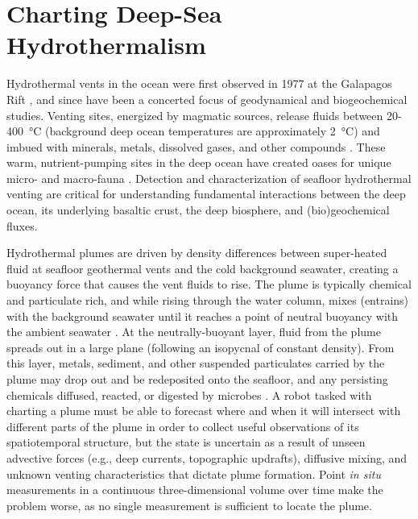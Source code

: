 \section{Charting Deep-Sea Hydrothermalism}
\label{sec:charting-plumes}
Hydrothermal vents in the ocean were first observed in 1977 at the Galapagos Rift \autocite{corliss1979submarine}, and since have been a concerted focus of geodynamical and biogeochemical studies. Venting sites, energized by magmatic sources, release fluids between 20-\SI{400}{\celsius} (background deep ocean temperatures are approximately \SI{2}{\celsius}) and imbued with minerals, metals, dissolved gases, and other compounds \autocite{jannasch1985geomicrobiology, martin2008hydrothermal}. These warm, nutrient-pumping sites in the deep ocean have created oases for unique micro- and macro-fauna \autocite{corliss1979submarine}. Detection and characterization of seafloor hydrothermal venting are critical for understanding fundamental interactions between the deep ocean, its underlying basaltic crust, the deep biosphere, and (bio)geochemical fluxes.

Hydrothermal plumes are driven by density differences between super-heated fluid at seafloor geothermal vents and the cold background seawater, creating a buoyancy force that causes the vent fluids to rise. The plume is typically chemical and particulate rich, and while rising through the water column, mixes (entrains) with the background seawater until it reaches a point of neutral buoyancy with the ambient seawater \autocite{speer1989model,jakuba2007stochastic,morton1956turbulent,lavelle2013turbulent}. At the neutrally-buoyant layer, fluid from the plume spreads out in a large plane (following an isopycnal of constant density). From this layer, metals, sediment, and other suspended particulates carried by the plume may drop out and be redeposited onto the seafloor, and any persisting chemicals diffused, reacted, or digested by microbes \autocite{scholz2019shelf,dick2013microbiology}. A robot tasked with charting a plume must be able to forecast where and when it will intersect with different parts of the plume in order to collect useful observations of its spatiotemporal structure, but the state is uncertain as a result of unseen advective forces (e.g., deep currents, topographic updrafts), diffusive mixing, and unknown venting characteristics that dictate plume formation. Point \emph{in situ} measurements in a continuous three-dimensional volume over time make the problem worse, as no single measurement is sufficient to locate the plume. 

